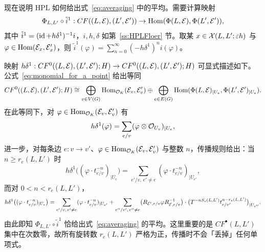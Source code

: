 现在说明 HPL 如何给出式~\eqref{eq:averaging} 中的平均。需要计算映射
\[
\Phi_{L,L'}\circ\tilde{i}^1:CF((L,\mathcal{E}),(L',\mathcal{E}'))\to \operatorname{Hom}(\Phi(L,\mathcal{E}),\Phi(L',\mathcal{E}')),
\]
其中 $\tilde{i}^1=(\operatorname{id}+h\delta^1)^{-1}i$，$i,h,\delta$ 如第~\ref{ss:HPLFloer} 节。取某 $x\in \mathcal{X}(L,L';\varepsilon h)$ 与 $\varphi\in\operatorname{Hom}(\mathcal{E}_x,\mathcal{E}'_x)$，则 $\tilde{i}^1(\varphi)=\sum_{n=0}^{\infty}(-h\delta^1)^n i(\varphi)$。

映射 $h\delta^1:CF^0((L,\mathcal{E}),(L',\mathcal{E}');H)\to CF^0((L,\mathcal{E}),(L',\mathcal{E}');H)$ 可显式描述如下。公式~\eqref{eq:monomial_for_a_point} 给出等同
\[
CF^0((L,\mathcal{E}),(L',\mathcal{E}');H)\cong \bigoplus_{v\in V(G)}\operatorname{Hom}_{\mathcal{O}_K}(\mathcal{E}_v,\mathcal{E}'_v)\oplus \bigoplus_{e\in E(G)}\operatorname{Hom}(\Phi(L,\mathcal{E})_{\mid U_e},\Phi(L',\mathcal{E}')_{\mid U_e}).
\]
在此等同下，对 $\varphi\in \operatorname{Hom}_{\mathcal{O}_K}(\mathcal{E}_v,\mathcal{E}'_v)$ 有
\[
h\delta^1(\varphi)=\sum_{e/v}(\varphi\otimes\mathcal{O}_{U_v})_{\mid U_e},
\]
进一步，对每条边 $e:v\to v'$、$\varphi\in\operatorname{Hom}_{\mathcal{O}_K}(\mathcal{E}_v,\mathcal{E}'_v)$ 与整数 $n$，传播规则给出：当 $n\geq r_e(L,L')$ 时
\[
h\delta^1\bigl((\varphi\cdot t_{e/v}^{-n})_{\mid U_e}\bigr)=\sum_{e'/v,\,e'\neq e}(\varphi\cdot t_{e/v}^{-n})_{\mid U_{e'}},
\]
而对 $0< n< r_e(L,L')$，
\[
h\delta^1\bigl((\varphi\cdot t_{e/v}^{-n})_{\mid U_e}\bigr)=\sum_{e'/v,\,e'\neq e}(\varphi\cdot t_{e/v}^{-n})_{\mid U_{e'}}
+\sum_{e''/v',\,e''\neq e}\bigl(R_{\mathcal{E}',e/v}\varphi R_{\mathcal{E},e/v}^{-1}\bigr)\cdot\bigl(T^{-nS_e(L,L')}t_{e/v'}^{n-r_e(L,L')}\bigr)_{\mid U_{e''}}.
\]
由此即知 $\Phi_{L,L'}\circ\tilde{i}^1$ 恰给出式~\eqref{eq:averaging} 的平均。这里重要的是 $CF^{\bullet}(L,L')$ 集中在次数零，故所有旋转数 $r_e(L,L')$ 严格为正，传播时不会「丢掉」任何单项式。
